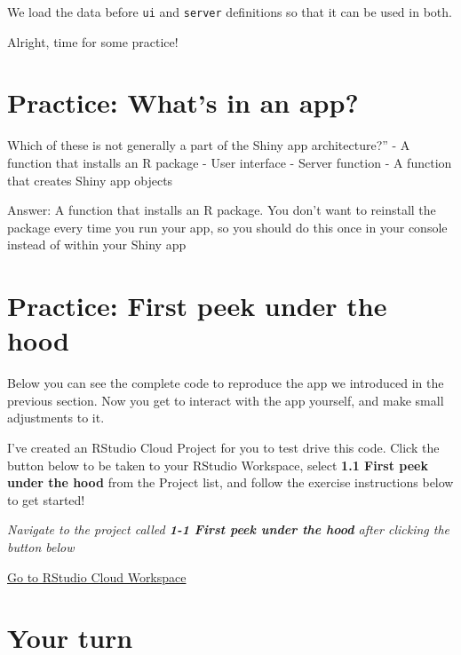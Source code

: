 \documentclass[
  letterpaper,
  DIV=11,
  numbers=noendperiod]{scrreprt}
\begin{document}
We load the data before \texttt{ui} and \texttt{server} definitions so
that it can be used in both.

Alright, time for some practice!

\hypertarget{practice-whats-in-an-app}{%
\section{Practice: What's in an app?}\label{practice-whats-in-an-app}}

Which of these is not generally a part of the Shiny app architecture?''
- A function that installs an R package - User interface - Server
function - A function that creates Shiny app objects

Answer: A function that installs an R package. You don't want to
reinstall the package every time you run your app, so you should do this
once in your console instead of within your Shiny app

\hypertarget{practice-first-peek-under-the-hood}{%
\section{Practice: First peek under the
hood}\label{practice-first-peek-under-the-hood}}

Below you can see the complete code to reproduce the app we introduced
in the previous section. Now you get to interact with the app yourself,
and make small adjustments to it.

I've created an RStudio Cloud Project for you to test drive this code.
Click the button below to be taken to your RStudio Workspace, select
\textbf{1.1 First peek under the hood} from the Project list, and follow
the exercise instructions below to get started!

\emph{Navigate to the project called \textbf{1-1 First peek under the
hood} after clicking the button below}

\href{https://rstudio.cloud/spaces/81721/join?access_code=I4VJaNsKfTqR3Td9hLP7E1nz8\%2FtMg6Xbw9Bgqumv}{
Go to RStudio Cloud Workspace}

\hypertarget{your-turn}{%
\section{Your turn}\label{your-turn}}
\end{document}
